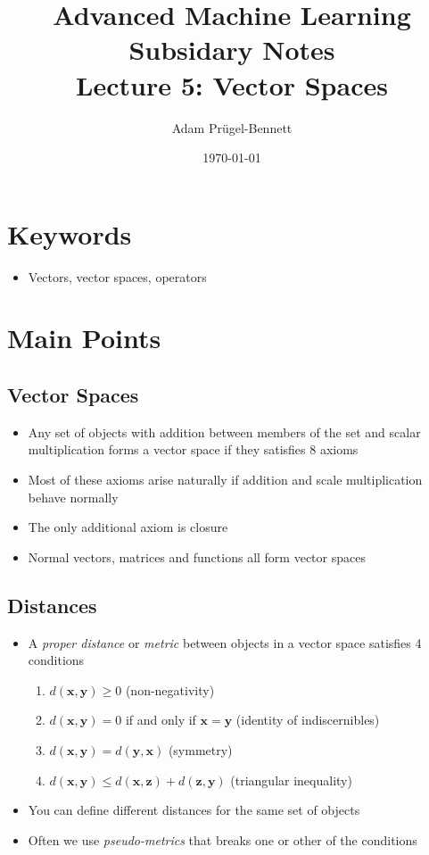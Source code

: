 \documentclass[11pt]{article}
\author{Adam Prügel-Bennett}
\date{\today}
\title{Advanced Machine Learning Subsidary Notes\\\medskip
\large Lecture 5: Vector Spaces}
\begin{document}
\maketitle



\section{Keywords}
\label{sec:org0f616a7}
\begin{itemize}
\item Vectors, vector spaces, operators
\end{itemize}

\section{Main Points}
\label{sec:org7318fa3}

\subsection{Vector Spaces}
\label{sec:org40f2bb2}
\begin{itemize}
\item Any set of objects with addition between members of the set and
scalar multiplication forms a vector space if they satisfies 8 axioms
\item Most of these axioms arise naturally if addition and scale multiplication
behave normally
\item The only additional axiom is closure
\item Normal vectors, matrices and functions all form vector spaces
\end{itemize}

\subsection{Distances}
\label{sec:org782a9c9}
\begin{itemize}
\item A \emph{proper distance} or \emph{metric} between objects in a vector space
satisfies 4 conditions
\begin{enumerate}
\item \(d(\bm{x},\bm{y})\geq0\) (non-negativity)
\item \(d(\bm{x},\bm{y}) = 0\) if and only if \(\bm{x}=\bm{y}\) (identity of indiscernibles)
\item \(d(\bm{x},\bm{y}) = d(\bm{y},\bm{x})\) (symmetry)
\item \(d(\bm{x},\bm{y}) \leq d(\bm{x},\bm{z}) + d(\bm{z},\bm{y})\) (triangular inequality)
\end{enumerate}
\item You can define different distances for the same set of objects
\item Often we use \emph{pseudo-metrics} that breaks one or other of the conditions
\end{itemize}
\end{document}
